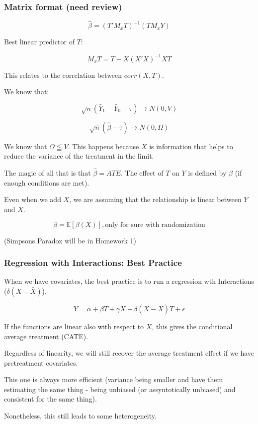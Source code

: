 \documentclass{article}
\begin{document}
\subsubsection{Matrix format (need review)}

$$
\hat{\beta} = (T' M_x T)^{-1} (T M_x Y)
$$

Best linear predictor of $T$:

$$
M_x T = T - X (X' X)^{-1} X T
$$

This relates to the correlation between $corr(X, T)$.

We know that:

$$
\sqrt{n} (\bar{Y}_1 - \bar{Y}_0 - \tau) \rightarrow N (0, V)
$$

$$
\sqrt{n} (\hat{\beta} - \tau) \rightarrow N (0, \Omega)
$$

We know that $\Omega \leqq V$. This happens because $X$ is information that helps to reduce the variance of the treatment in the limit.

The magic of all that is that $\hat{\beta} = ATE$. The effect of $T$ on $Y$ is defined by $\beta$ (if enough conditions are met).

Even when we add $X$, we are assuming that the relationship is linear between $Y$ and $X$.

$$
\beta = \mathbb{E}[\beta(X)], \text{only for sure with randomization}
$$

(Simpsons Paradox will be in Homework 1)

\subsubsection{Regression with Interactions: Best Practice}
When we have covariates, the best practice is to run a regression wth Interactions ($\delta (X - \bar{X})$).

$$
Y = \alpha + \beta T + \gamma X + \delta (X - \bar{X}) T + \epsilon
$$

If the functions are linear also with respect to $X$, this gives the conditional average treatment (CATE).

Regardless of linearity, we will still recover the average treatment effect if we have pretreatment covariates.

This one is always more efficient (variance being smaller and have them estimating the same thing - being unbiased (or assyntotically unbiased) and consistent for the same thing).

Nonetheless, this still leads to some heterogeneity.
\end{document}
